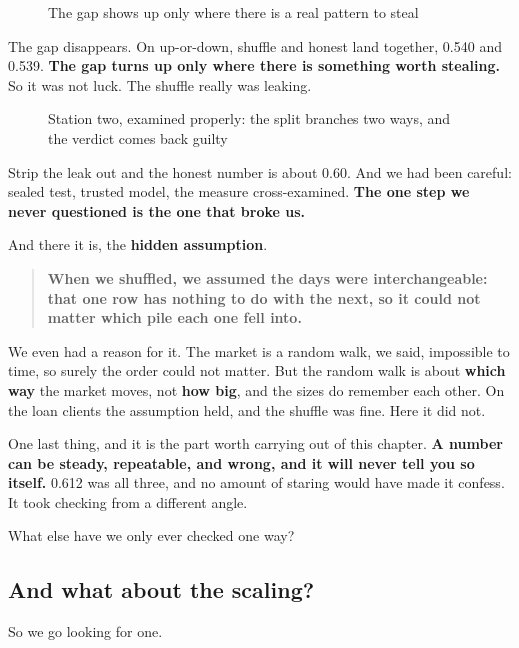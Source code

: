 \documentclass[11pt]{article} %
\begin{document}
\begin{figure}[htbp]
\centering

\caption{The gap shows up only where there is a real pattern to steal}
\end{figure}


The gap disappears. On up-or-down, shuffle and honest land together, 0.540 and 0.539. \textbf{The gap turns up only where there is something worth stealing.} So it was not luck. The shuffle really was leaking.

\begin{figure}[htbp]
\centering

\caption{Station two, examined properly: the split branches two ways, and the verdict comes back guilty}
\end{figure}


Strip the leak out and the honest number is about 0.60. And we had been careful: sealed test, trusted model, the measure cross-examined. \textbf{The one step we never questioned is the one that broke us.}

And there it is, the \textbf{hidden assumption}. 

\begin{quote}
\textbf{When we shuffled, we assumed the days were interchangeable: that one row has nothing to do with the next, so it could not matter which pile each one fell into.}
\end{quote}


We even had a reason for it. The market is a random walk, we said, impossible to time, so surely the order could not matter. But the random walk is about \textbf{which way} the market moves, not \textbf{how big}, and the sizes do remember each other. On the loan clients the assumption held, and the shuffle was fine. Here it did not.

One last thing, and it is the part worth carrying out of this chapter. \textbf{A number can be steady, repeatable, and wrong, and it will never tell you so itself.} 0.612 was all three, and no amount of staring would have made it confess. It took checking from a different angle.

What else have we only ever checked one way?


\subsection{And what about the scaling?}


So we go looking for one.
\end{document}
